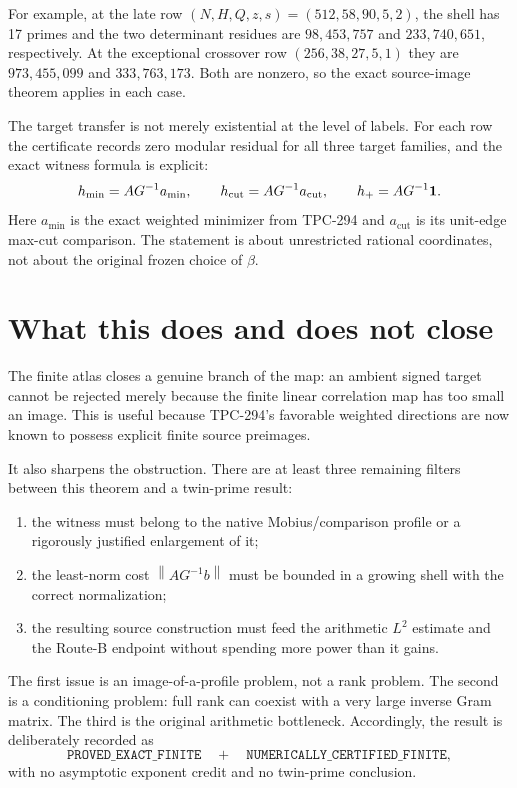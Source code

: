 \documentclass[10pt]{article}
\newcommand{\norm}[1]{\left\lVert #1\right\rVert}
\begin{document}
For example, at the late row
$(N,H,Q,z,s)=(512,58,90,5,2)$, the shell has 17 primes and the two
determinant residues are $98{,}453{,}757$ and $233{,}740{,}651$, respectively.
At the exceptional crossover row $(256,38,27,5,1)$ they are
$973{,}455{,}099$ and $333{,}763{,}173$.  Both are nonzero, so the exact
source-image theorem applies in each case.

The target transfer is not merely existential at the level of labels.  For
each row the certificate records zero modular residual for all three target
families, and the exact witness formula is explicit:
\[
 h_{\min}=AG^{-1}a_{\min},\qquad
 h_{\mathrm{cut}}=AG^{-1}a_{\mathrm{cut}},\qquad
 h_+=AG^{-1}{\bf 1}.
\]
Here $a_{\min}$ is the exact weighted minimizer from TPC-294 and
$a_{\mathrm{cut}}$ is its unit-edge max-cut comparison.  The statement is
about unrestricted rational coordinates, not about the original frozen
choice of $\beta$.

\section{What this does and does not close}

The finite atlas closes a genuine branch of the map: an ambient signed
target cannot be rejected merely because the finite linear correlation map
has too small an image.  This is useful because TPC-294's favorable
weighted directions are now known to possess explicit finite source
preimages.

It also sharpens the obstruction.  There are at least three remaining
filters between this theorem and a twin-prime result:

\begin{enumerate}
\item the witness must belong to the native Mobius/comparison profile or a
      rigorously justified enlargement of it;
\item the least-norm cost $\norm{AG^{-1}b}$ must be bounded in a growing
      shell with the correct normalization;
\item the resulting source construction must feed the arithmetic $L^2$
      estimate and the Route-B endpoint without spending more power than it
      gains.
\end{enumerate}

The first issue is an image-of-a-profile problem, not a rank problem.  The
second is a conditioning problem: full rank can coexist with a very large
inverse Gram matrix.  The third is the original arithmetic bottleneck.
Accordingly, the result is deliberately recorded as
\[
\texttt{PROVED\_EXACT\_FINITE}\quad+\quad
\texttt{NUMERICALLY\_CERTIFIED\_FINITE},
\]
with no asymptotic exponent credit and no twin-prime conclusion.
\end{document}
